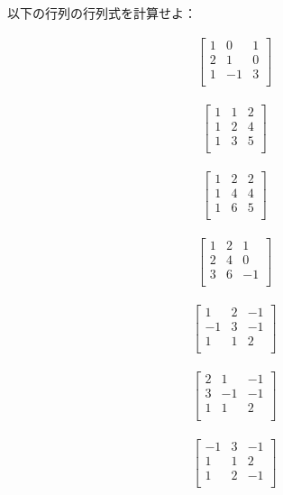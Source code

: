 \begin{q}\label{q:univ_det3D0} 以下の行列の行列式を計算せよ：
\begin{edaenumerate}
\item
\begin{eqnarray*} \begin{bmatrix}1 & 0 & 1\\
2 & 1 & 0\\
1 & -1 & 3\\
\end{bmatrix}\end{eqnarray*}
\item
\begin{eqnarray*} \begin{bmatrix}1 & 1 & 2\\
1 & 2 & 4\\
1 & 3 & 5\\
\end{bmatrix}\end{eqnarray*}
\item
\begin{eqnarray*} \begin{bmatrix}1 & 2 & 2\\
1 & 4 & 4\\
1 & 6 & 5\\
\end{bmatrix}\end{eqnarray*}
\item
\begin{eqnarray*} \begin{bmatrix}1 & 2 & 1\\
2 & 4 & 0\\
3 & 6 & -1\\
\end{bmatrix}\end{eqnarray*}
\item
\begin{eqnarray*} \begin{bmatrix}1 & 2 & -1\\
-1 & 3 & -1\\
1 & 1 & 2\\
\end{bmatrix}\end{eqnarray*}
\item
\begin{eqnarray*} \begin{bmatrix}2 & 1 & -1\\
3 & -1 & -1\\
1 & 1 & 2\\
\end{bmatrix}\end{eqnarray*}
\item
\begin{eqnarray*} \begin{bmatrix}-1 & 3 & -1\\
1 & 1 & 2\\
1 & 2 & -1\\
\end{bmatrix}\end{eqnarray*}
\end{edaenumerate}\end{q}
\mv



